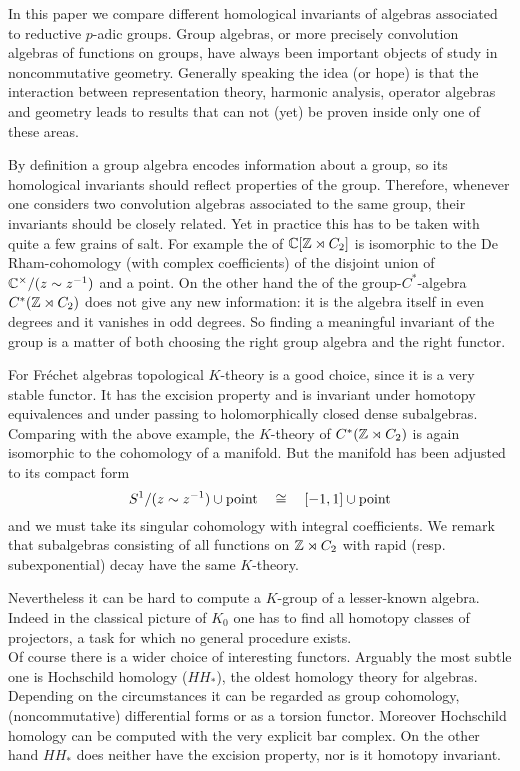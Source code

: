 In this paper we compare different homological invariants of algebras 
associated to reductive $p$-adic groups. Group algebras, or more precisely 
convolution algebras of functions on groups, have always been important 
objects of study in noncommutative geometry. Generally speaking the idea
(or hope) is that the interaction between representation theory, harmonic
analysis, operator algebras and geometry leads to results that can not (yet)
be proven inside only one of these areas. 

By definition a group algebra encodes information about a group, so its 
homological invariants should reflect properties of the group. 
Therefore, whenever one considers two convolution algebras 
associated to the same group, their invariants should be closely related. 
Yet in practice this has to be taken with quite a few grains of salt.
For example the \pch of $\mathbb C [\mathbb Z \rtimes C_2 ]$ is isomorphic
to the De Rham-cohomology (with complex coefficients) of the disjoint union of 
$\mathbb C^\times / (z \sim z^{-1})$ and a point. On the other hand the \pch of
the group-$C^*$-algebra $C^* (\mathbb Z \rtimes C_2 )$ does not give any new
information: it is the algebra itself in even degrees and it vanishes in odd 
degrees. So finding a meaningful invariant of the group is a matter of both
choosing the right group algebra and the right functor.

For Fr\'echet algebras topological $K$-theory is a good choice, since it is a 
very stable functor. It has the excision property and is invariant under homotopy 
equivalences and under passing to holomorphically closed dense subalgebras. 
Comparing with the above example, the $K$-theory of $C^* (\mathbb Z \rtimes C_2)$
is again isomorphic to the cohomology of a manifold. But the manifold
has been adjusted to its compact form 
\[
S^1 / (z \sim z^{-1}) \cup \mathrm{point} \quad \cong \quad [-1,1] \cup \mathrm{point}
\]
and we must take its singular cohomology with integral coefficients. We remark 
that subalgebras consisting of all functions on $\mathbb Z \rtimes C_2$ with rapid 
(resp. subexponential) decay have the same $K$-theory.

Nevertheless it can be hard to compute a $K$-group of a lesser-known algebra.
Indeed in the classical picture of $K_0$ one has to find all homotopy classes of 
projectors, a task for which no general procedure exists.
\\[1mm]

Of course there is a wider choice of interesting functors. Arguably the most subtle
one is Hochschild homology ($HH_*$), the oldest homology theory for algebras.
Depending on the circumstances it can be regarded as group cohomology,
(noncommutative) differential forms or as a torsion functor. Moreover Hochschild
homology can be computed with the very explicit bar complex. On the other hand
$HH_*$ does neither have the excision property, nor is it homotopy invariant. 

